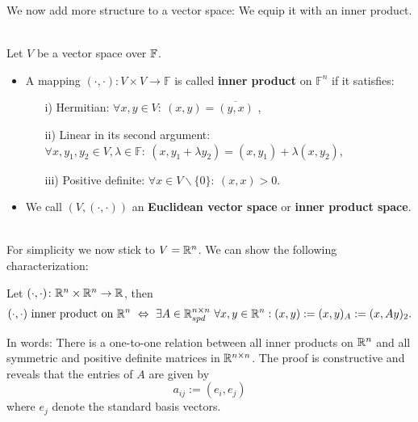 \begin{frame}
	We now add more structure to a vector space: We equip it with an inner product. \\~\\
	\begin{definition}
	Let $V$ be a vector space over ${\mathbb{F}}$.
\begin{itemize}
	\item  A mapping $(\cdot,\cdot)\colon V\times V \to \mathbb{F}$ is called \textbf{inner product} on $\mathbb{F}^n$ if it satisfies:
		\begin{itemize}
			\item[i)] Hermitian: $\forall x,y \in V: ~(x,y) = \overline{(y,x)}$ ,
			\item[ii)] Linear in its second argument: $\forall x,y_1,y_2 \in V, \lambda \in \mathbb{F}: ~(x,y_1+\lambda y_2) = (x,y_1)+\lambda (x,y_2)$,
			\item[iii)] Positive definite: $\forall x \in V\backslash\{0\}: ~ (x,x) > 0$.
		\end{itemize}
	\item
	We call $(V,(\cdot,\cdot))$  an \textbf{\color{defgruen} Euclidean vector space} or \textbf{\color{defgruen} inner product space}.
\end{itemize}
	\end{definition}
~\\
For simplicity we now stick to $V={\mathbb{R}}^n$. We can show the following characterization:
\begin{theorem}
	Let $(\cdot,\cdot)\colon {\mathbb{R}}^{n} \times {\mathbb{R}}^{n} \to {\mathbb{R}}$, then
	$$(\cdot,\cdot)~\text{inner product on ${\mathbb{R}}^{n}$}~\Leftrightarrow~\exists A \in {\mathbb{R}}^{n\times n}_{spd}~\forall x,y\in{\mathbb{R}}^{n}: (x,y) :=(x,y)_A:= (x,Ay)_2.$$
\end{theorem}
In words: There is a one-to-one relation between all inner products on ${\mathbb{R}}^{n}$ and all symmetric and positive definite matrices in ${\mathbb{R}}^{n\times n}$. The proof is constructive and reveals that the entries of $A$ are given by
$$a_{ij} := (e_i, e_j) $$
where $e_j$ denote the standard basis vectors.
\end{frame}

